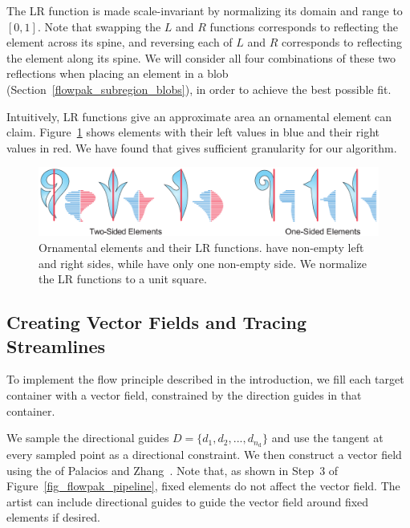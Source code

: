The LR function is made scale-invariant by normalizing its
domain and range to $[0,1]$.  Note that swapping the $L$ and $R$ functions
corresponds to reflecting the element across its spine, and reversing each
of $L$ and $R$ corresponds to reflecting the element along its spine.  We
will consider all four combinations of these two reflections when placing 
an element in a blob (Section~\ref{flowpak_subregion_blobs}),
in order to achieve the best possible fit.

Intuitively, LR functions give an approximate area an ornamental element can claim.
Figure~\ref{ornamental_shapes_fig} 
shows elements with their left values
in blue and their right values in red. We have found that  gives sufficient
granularity for our algorithm.

\begin{figure}
\centering
\includegraphics[width=1.0\textwidth]{figures/flowpak/ornaments.pdf}
\caption[Ornamental elements and their LR functions]
{\label{ornamental_shapes_fig}
Ornamental elements and their LR functions.  have non-empty
left and right sides, while  have only one non-empty side. 
We normalize the LR functions to a unit square.}
\end{figure}

\subsection{Creating Vector Fields and Tracing Streamlines}
\label{flowpak_creating_vector_fields_and_tracing_streamlines}

To implement the flow principle described in the introduction, we fill each target
container with a vector field, constrained by the direction guides in that container.

We sample the directional guides $D = \{ d_{1}, d_{2}, ... , d_{n_\mathrm{d}}\}$  
and use the tangent at every sampled point as a directional constraint.
We then construct a vector field using the 
of Palacios and Zhang~\cite{Palacios2007}.  Note that, as shown in 
Step~3 of Figure~\ref{fig_flowpak_pipeline},
fixed elements do not affect the vector field.  
The artist can include directional guides to guide the vector field around fixed elements if desired.


